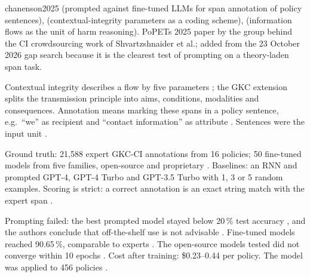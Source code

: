 \begin{papercard}{chanenson2025}
  (prompted against fine-tuned LLMs for span annotation of policy sentences),  (contextual-integrity parameters as a coding scheme),  (information flows as the unit of harm reasoning). PoPETs 2025 paper by the group behind the CI crowdsourcing work of Shvartzshnaider et al.; added from the 23 October 2026 gap search because it is the clearest test of prompting on a theory-laden span task.

 Contextual integrity describes a flow by five parameters ; the GKC extension splits the transmission principle into aims, conditions, modalities and consequences. Annotation means marking these spans in a policy sentence, e.g.\ ``we'' as recipient and ``contact information'' as attribute . Sentences were the input unit .

 Ground truth: 21,588 expert GKC-CI annotations from 16 policies; 50 fine-tuned models from five families, open-source and proprietary . Baselines: an RNN and prompted GPT-4, GPT-4 Turbo and GPT-3.5 Turbo with 1, 3 or 5 random examples. Scoring is strict: a correct annotation is an exact string match with the expert span .

 Prompting failed: the best prompted model stayed below 20\,\% test accuracy , and the authors conclude that off-the-shelf use is not advisable . Fine-tuned models reached 90.65\,\%, comparable to experts . The open-source models tested did not converge within 10 epochs . Cost after training: \$0.23--0.44 per policy. The model was applied to 456 policies .


\end{papercard}

